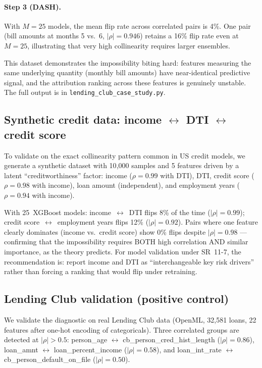 \documentclass{article}
\begin{document}
\paragraph{Step 3 (DASH).} With $M = 25$ models, the mean flip rate
across correlated pairs is 4\%. One pair (bill amounts at months 5
vs.\ 6, $|\rho| = 0.946$) retains a 16\% flip rate even at $M = 25$,
illustrating that very high collinearity requires larger ensembles.

This dataset demonstrates the impossibility biting hard: features
measuring the same underlying quantity (monthly bill amounts) have
near-identical predictive signal, and the attribution ranking across
these features is genuinely unstable.
The full output is in \texttt{lending\_club\_case\_study.py}.

\subsection{Synthetic credit data: income $\leftrightarrow$ DTI $\leftrightarrow$ credit score}

To validate on the exact collinearity pattern common in US credit
models, we generate a synthetic dataset with 10{,}000 samples and
5 features driven by a latent ``creditworthiness'' factor:
income ($\rho = 0.99$ with DTI), DTI, credit score ($\rho = 0.98$
with income), loan amount (independent), and employment years
($\rho = 0.94$ with income).

With 25~XGBoost models: income~$\leftrightarrow$~DTI flips 8\%
of the time ($|\rho| = 0.99$); credit score~$\leftrightarrow$~employment
years flips 12\% ($|\rho| = 0.92$). Pairs where one feature clearly
dominates (income vs.\ credit score) show 0\% flips despite
$|\rho| = 0.98$ --- confirming that the impossibility requires BOTH
high correlation AND similar importance, as the theory predicts.
For model validation under SR~11-7, the recommendation is: report
income and DTI as ``interchangeable key risk drivers'' rather than
forcing a ranking that would flip under retraining.

\subsection{Lending Club validation (positive control)}

We validate the diagnostic on real Lending Club data (OpenML,
32{,}581 loans, 22 features after one-hot encoding of categoricals).
Three correlated groups are detected at $|\rho| > 0.5$:
person\_age $\leftrightarrow$ cb\_person\_cred\_hist\_length
($|\rho| = 0.86$), loan\_amnt $\leftrightarrow$
loan\_percent\_income ($|\rho| = 0.58$), and loan\_int\_rate
$\leftrightarrow$ cb\_person\_default\_on\_file ($|\rho| = 0.50$).
\end{document}
